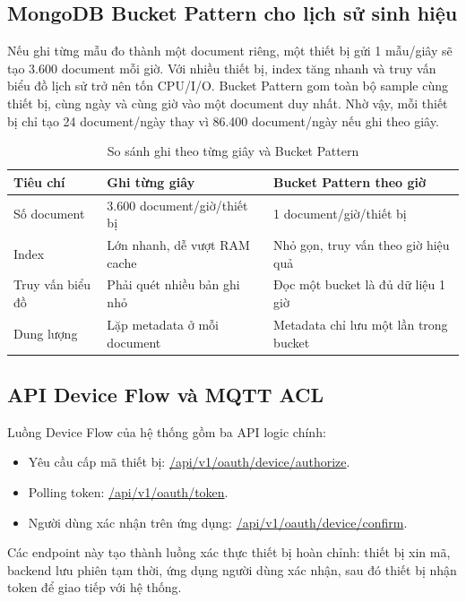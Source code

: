 \documentclass[a4paper,13pt,3p,oneside]{report}
\begin{document}
\subsection{MongoDB Bucket Pattern cho lịch sử sinh hiệu}
Nếu ghi từng mẫu đo thành một document riêng, một thiết bị gửi 1 mẫu/giây sẽ tạo 3.600 document mỗi giờ. Với nhiều thiết bị, index tăng nhanh và truy vấn biểu đồ lịch sử trở nên tốn CPU/I/O. Bucket Pattern gom toàn bộ sample cùng thiết bị, cùng ngày và cùng giờ vào một document duy nhất. Nhờ vậy, mỗi thiết bị chỉ tạo 24 document/ngày thay vì 86.400 document/ngày nếu ghi theo giây.

\begin{table}[H]
\centering
\caption{So sánh ghi theo từng giây và Bucket Pattern}
\begin{tabular}{p{4cm}p{5cm}p{5cm}}
\toprule
\textbf{Tiêu chí} & \textbf{Ghi từng giây} & \textbf{Bucket Pattern theo giờ} \\
\midrule
Số document & 3.600 document/giờ/thiết bị & 1 document/giờ/thiết bị \\
Index & Lớn nhanh, dễ vượt RAM cache & Nhỏ gọn, truy vấn theo giờ hiệu quả \\
Truy vấn biểu đồ & Phải quét nhiều bản ghi nhỏ & Đọc một bucket là đủ dữ liệu 1 giờ \\
Dung lượng & Lặp metadata ở mỗi document & Metadata chỉ lưu một lần trong bucket \\
\bottomrule
\end{tabular}
\end{table}

\subsection{API Device Flow và MQTT ACL}
Luồng Device Flow của hệ thống gồm ba API logic chính:

\begin{itemize}
    \item Yêu cầu cấp mã thiết bị: \url{/api/v1/oauth/device/authorize}.
    \item Polling token: \url{/api/v1/oauth/token}.
    \item Người dùng xác nhận trên ứng dụng: \url{/api/v1/oauth/device/confirm}.
\end{itemize}

Các endpoint này tạo thành luồng xác thực thiết bị hoàn chỉnh: thiết bị xin mã, backend lưu phiên tạm thời, ứng dụng người dùng xác nhận, sau đó thiết bị nhận token để giao tiếp với hệ thống.
\end{document}
